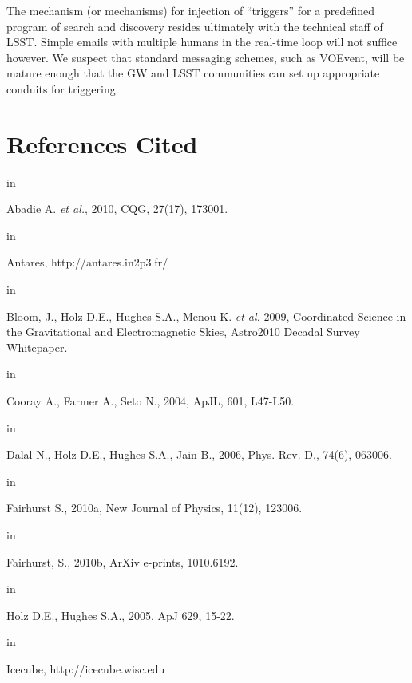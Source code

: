 \documentclass [11pt]{article}
\begin{document}
The mechanism (or mechanisms) for injection of ``triggers'' for a predefined program of search and discovery resides ultimately with the technical staff of LSST. Simple emails with multiple humans in the real-time loop will not suffice however. We suspect that standard messaging schemes, such as VOEvent, will be mature enough that the GW and LSST communities can set up appropriate conduits for triggering.


\section{References Cited}

 in 
\par\noindent\hangindent=10pt
Abadie A. {\it et al.},
2010, CQG, 27(17), 173001.

 in 
\par\noindent\hangindent=10pt
Antares, http://antares.in2p3.fr/ 

 in 
\par\noindent\hangindent=10pt
Bloom, J., Holz D.E., Hughes S.A., Menou K. {\it et al.}
2009, Coordinated Science in the Gravitational and Electromagnetic Skies, Astro2010 Decadal Survey Whitepaper. 

 in 
\par\noindent\hangindent=10pt
Cooray A., Farmer A., Seto N.,
2004, ApJL, 601, L47-L50.

 in 
\par\noindent\hangindent=10pt
Dalal N., Holz D.E., Hughes S.A., Jain B., 
2006, Phys. Rev. D., 74(6), 063006.

 in 
\par\noindent\hangindent=10pt
Fairhurst S.,
2010a, New Journal of Physics, 11(12), 123006.

 in 
\par\noindent\hangindent=10pt
Fairhurst, S.,
2010b, ArXiv e-prints, 1010.6192.

 in 
\par\noindent\hangindent=10pt
Holz D.E., Hughes S.A.,
2005, ApJ 629, 15-22.

 in 
\par\noindent\hangindent=10pt
Icecube, http://icecube.wisc.edu
\end{document}
